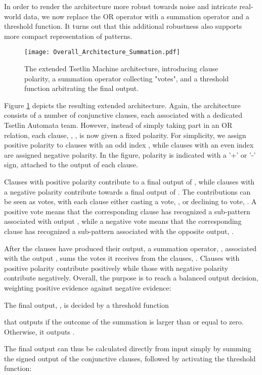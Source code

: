 \documentclass[11pt,a4paper]{article}
\begin{document}
In order to render the architecture more robust towards noise and intricate real-world data, we now replace the OR operator with a summation operator and a threshold function. It turns out that this additional robustness also supports more compact representation of patterns.

\begin{figure}[!t]
\centering
\texttt{[image: Overall\_Architecture\_Summation.pdf]}
\caption{The extended Tsetlin Machine architecture, introducing clause polarity, a summation operator collecting "votes", and a threshold function arbitrating the final output.}
\label{figure:architecture_summation}
\end{figure}

Figure \ref{figure:architecture_summation} depicts the resulting extended architecture. Again, the architecture consists of a number of conjunctive clauses, each associated with a dedicated Tsetlin Automata team. However, instead of simply taking part in an OR relation, each clause, , , is now given a fixed polarity. For simplicity, we assign positive polarity to clauses with an odd index , while clauses with an even index are assigned negative polarity. In the figure, polarity is indicated with a '+' or '-'  sign, attached to the output of each clause.

Clauses with positive polarity contribute to a final output of , while clauses with a negative polarity contribute towards a final output of . The contributions can be seen as votes, with each clause either casting a vote, , or declining to vote, . A positive vote means that the corresponding clause has recognized a sub-pattern associated with output , while a negative vote means that the corresponding clause has recognized a sub-pattern associated with the opposite output, .

After the clauses have produced their output, a summation operator, , associated with the output , sums the votes it receives from the clauses, . Clauses with positive polarity contribute positively while those with negative polarity contribute negatively. Overall, the purpose is to reach a balanced output decision, weighting positive evidence against negative evidence:

The final output, , is decided by a threshold function

that outputs  if the outcome of the summation is larger than or equal to zero. Otherwise, it outputs .

The final output can thus be calculated directly from input  simply by summing the signed output of the  conjunctive clauses, followed by activating the threshold function:
\end{document}
